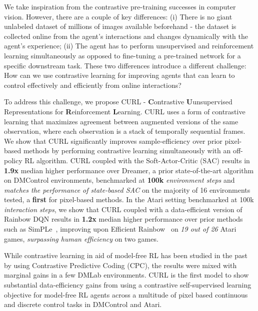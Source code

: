 We take inspiration from the contrastive pre-training successes in computer vision. However, there are a couple of key differences: (i) There is no giant unlabeled dataset of millions of images available beforehand - the dataset is collected online from the agent's interactions and changes dynamically with the agent's experience; (ii) The agent has to perform unsupervised and reinforcement learning simultaneously as opposed to fine-tuning a pre-trained network for a specific downstream task. These two differences introduce a different challenge: How can we use contrastive learning for improving agents that can learn to control effectively and efficiently from online interactions? 


To address this challenge, we propose CURL - \textbf{C}ontrastive \textbf{U}unsupervised Representations for \textbf{R}einforcement \textbf{L}earning. CURL uses a form of contrastive learning that maximizes agreement between augmented versions of the same observation, where each observation is a stack of temporally sequential frames. We show that CURL significantly improves sample-efficiency over prior pixel-based methods by performing contrastive learning simultaneously with an off-policy RL algorithm. CURL coupled with the Soft-Actor-Critic (SAC) \cite{haarnoja2018soft} results in {\textbf{1.9x}} median higher performance over Dreamer, a prior state-of-the-art algorithm on DMControl environments, benchmarked at {\textbf{100k}} {\it environment steps} and {\it matches the performance of state-based SAC} on the majority of 16 environments tested, a {\textbf{first}} for pixel-based methods. In the Atari setting benchmarked at 100k {\it interaction steps}, we show that CURL coupled with a data-efficient version of Rainbow DQN \cite{van2019use} results in {\textbf{1.2x}} median higher performance over prior methods such as SimPLe~\cite{kaiser2019model}, improving upon Efficient Rainbow~\cite{van2019use} on {\it 19 out of 26} Atari games, {\it surpassing human efficiency} on two games. 

While contrastive learning in aid of model-free RL has been studied in the past by \citet{oord2018representation} using Contrastive Predictive Coding (CPC), the results were mixed with marginal gains in a few DMLab \cite{espeholt2018impala} environments. CURL is the first model to show substantial data-efficiency gains from using a contrastive self-supervised learning objective for model-free RL agents across a multitude of pixel based continuous and discrete control tasks in DMControl and Atari.


